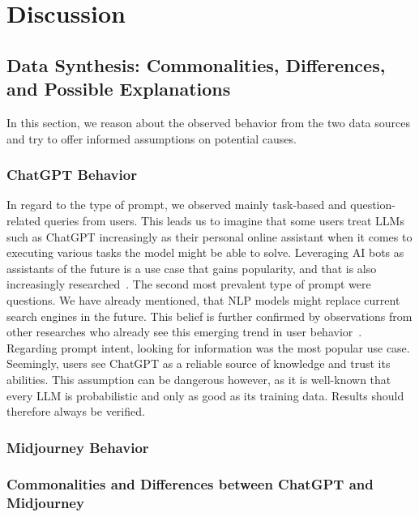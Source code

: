 \section{Discussion}
\label{sec:discussion}


\subsection{Data Synthesis: Commonalities, Differences, and Possible Explanations}
\label{subsec:data-synthesis:-commonalities-differences-and-possible-explanations}
In this section, we reason about the observed behavior from the two data sources and try to offer
informed assumptions on potential causes.

\subsubsection{ChatGPT Behavior}
In regard to the type of prompt, we observed mainly task-based and question-related queries from
users.
This leads us to imagine that some users treat LLMs such as ChatGPT increasingly as their
personal online assistant when it comes to executing various tasks the model might be able to solve.
Leveraging AI bots as assistants of the future is a use case that gains popularity, and that is also
increasingly researched~\cite{eshghie_chatgpt_2023}.
The second most prevalent type of prompt were questions.
We have already mentioned, that NLP models might replace current search engines in the future.
This belief is further confirmed by observations from other researches who already see this
emerging trend in user behavior~\cite{van_bulck_what_2023}.
Regarding prompt intent, looking for information was the most popular use case.
Seemingly, users see ChatGPT as a reliable source of knowledge and trust its abilities.
This assumption can be dangerous however, as it is well-known that every LLM is probabilistic and
only as good as its training data.
Results should therefore always be verified.


\subsubsection{Midjourney Behavior}

\subsubsection{Commonalities and Differences between ChatGPT and Midjourney}

